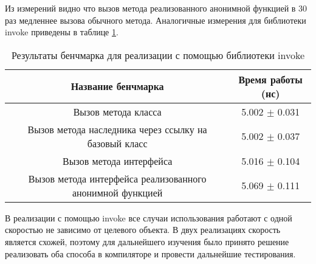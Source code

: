 Из измерений видно что вызов метода реализованного анонимной функцией в 30 раз медленнее вызова обычного метода. Аналогичные измерения для библиотеки invoke приведены в таблице \ref{benchmark:prototype:invoke}.

\begin{table}[h]
\begin{center}
\begin{tabular}{|c|c|} \hline
Название бенчмарка & Время работы (нс) \\ \hline
Вызов метода класса & 5.002 $\pm$ 0.031 \\ \hline
Вызов метода наследника через ссылку на базовый класс & 5.002 $\pm$ 0.037 \\ \hline
Вызов метода интерфейса & 5.016 $\pm$ 0.104 \\ \hline
Вызов метода интерфейса реализованного анонимной функцией & 5.069 $\pm$ 0.111 \\ \hline
\end{tabular}
\caption{Результаты бенчмарка для реализации с помощью библиотеки invoke}
\label{benchmark:prototype:invoke}
\end{center}
\end{table}

В реализации с помощью invoke все случаи использования работают с одной скоростью не зависимо от целевого объекта. В двух реализациях скорость является схожей, поэтому для дальнейшего изучения было принято решение реализовать оба способа в компиляторе и провести дальнейшие тестирования.
